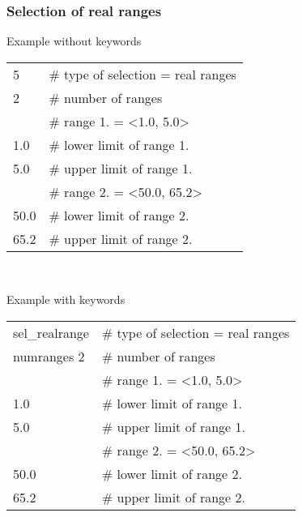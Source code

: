 \subsubsection{Selection of real ranges}
Example without keywords
\begin{center}
\begin{tabular}{|ll|}
\hline
5    & \# type of selection = real ranges \\
2    & \# number of ranges                \\
     & \# range 1. = <1.0, 5.0>           \\
1.0  & \# lower limit of range 1.       \\
5.0  & \# upper limit of range 1.       \\
     & \# range 2. = <50.0, 65.2>         \\
50.0 & \# lower limit of range 2.       \\
65.2 & \# upper limit of range 2.           \\
\hline
\end{tabular}\\
\end{center}
Example with keywords
\begin{center}
\begin{tabular}{|ll|}
\hline
sel\_realrange  & \# type of selection = real ranges \\
numranges 2     & \# number of ranges                \\
                & \# range 1. = <1.0, 5.0>           \\
1.0             & \# lower limit of range 1.       \\
5.0             & \# upper     limit of range 1.       \\
                & \# range 2. = <50.0, 65.2>         \\
50.0            & \# lower limit of range 2.       \\
65.2            & \# upper limit of range 2.           \\
\hline
\end{tabular}\\
\end{center}



